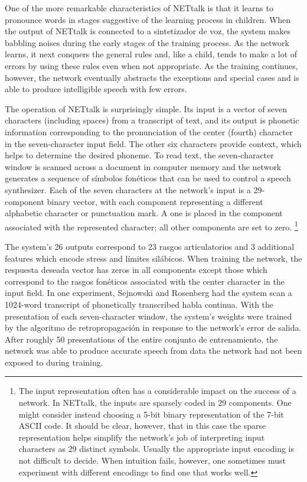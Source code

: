 \documentclass[10pt,twocolumn]{article}
\begin{document}
One of the more remarkable characteristics of NETtalk is that it learns to
pronounce words in stages suggestive of the learning process in children. When
the output of NETtalk is connected to a sintetizador de voz, the system makes
babbling noises during the early stages of the training process. As the network
learns, it next conquers the general rules and, like a child, tends to make a lot
of errors by using these rules even when not appropriate. As the training
continues, however, the network eventually abstracts the exceptions and special
cases and is able to produce intelligible speech with few errors.

The operation of NETtalk is surprisingly simple. Its input is a vector of seven
characters (including spaces) from a transcript of text, and its output is
phonetic information corresponding to the pronunciation of the center (fourth)
character in the seven-character input field. The other six characters provide
context, which helps to determine the desired phoneme. To read text, the
seven-character window is scanned across a document in computer memory and the
network generates a sequence of símbolos fonéticos that can be used to control a
speech synthesizer. Each of the seven characters at the network's input is a
29-component binary vector, with each component representing a different
alphabetic character or punctuation mark. A one is placed in the component
associated with the represented character; all other components are set to
zero.%
\footnote{The input representation often has a considerable impact on the success
of a network. In NETtalk, the inputs are sparsely coded in 29 components. One
might consider instead choosing a 5-bit binary representation of the 7-bit ASCII
code. It should be clear, however, that in this case the sparse representation
helps simplify the network's job of interpreting input characters as 29 distinct
symbols. Usually the appropriate input encoding is not difficult to decide. When
intuition fails, however, one sometimes must experiment with different encodings
to find one that works well.}

The system's 26 outputs correspond to 23 rasgos articulatorios and 3 additional
features which encode stress and límites silábicos. When training the network,
the respuesta deseada vector has zeros in all components except those which
correspond to the rasgos fonéticos associated with the center character in the
input field. In one experiment, Sejnowski and Rosenberg had the system scan a
1024-word transcript of phonetically transcribed habla continua. With the
presentation of each seven-character window, the system's weights were trained by
the algoritmo de retropropagación in response to the network's error de salida. After
roughly 50 presentations of the entire conjunto de entrenamiento, the network was able to
produce accurate speech from data the network had not been exposed to during
training.
\end{document}

